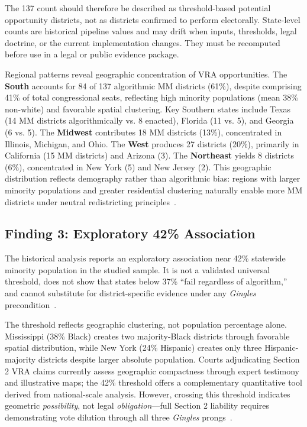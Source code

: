 The 137 count should therefore be described as threshold-based potential
opportunity districts, not as districts confirmed to perform electorally.
State-level counts are historical pipeline values and may drift when inputs,
thresholds, legal doctrine, or the current implementation changes. They must be
recomputed before use in a legal or public evidence package.

Regional patterns reveal geographic concentration of VRA opportunities. The \textbf{South} accounts for 84 of 137 algorithmic MM districts (61\%), despite comprising 41\% of total congressional seats, reflecting high minority populations (mean 38\% non-white) and favorable spatial clustering. Key Southern states include Texas (14 MM districts algorithmically vs. 8 enacted), Florida (11 vs. 5), and Georgia (6 vs. 5). The \textbf{Midwest} contributes 18 MM districts (13\%), concentrated in Illinois, Michigan, and Ohio. The \textbf{West} produces 27 districts (20\%), primarily in California (15 MM districts) and Arizona (3). The \textbf{Northeast} yields 8 districts (6\%), concentrated in New York (5) and New Jersey (2). This geographic distribution reflects demography rather than algorithmic bias: regions with larger minority populations and greater residential clustering naturally enable more MM districts under neutral redistricting principles~\cite{deluca2026vra}.

\subsection{Finding 3: Exploratory 42\% Association}

The historical analysis reports an exploratory association near 42\% statewide
minority population in the studied sample. It is not a validated universal
threshold, does not show that states below 37\% ``fail regardless of
algorithm,'' and cannot substitute for district-specific evidence under any
\emph{Gingles} precondition~\cite{deluca2026threshold}.

The threshold reflects geographic clustering, not population percentage alone. Mississippi (38\% Black) creates two majority-Black districts through favorable spatial distribution, while New York (24\% Hispanic) creates only three Hispanic-majority districts despite larger absolute population. Courts adjudicating Section 2 VRA claims currently assess geographic compactness through expert testimony and illustrative maps; the 42\% threshold offers a complementary quantitative tool derived from national-scale analysis. However, crossing this threshold indicates geometric \emph{possibility}, not legal \emph{obligation}---full Section 2 liability requires demonstrating vote dilution through all three \emph{Gingles} prongs~\cite{deluca2026threshold}.

